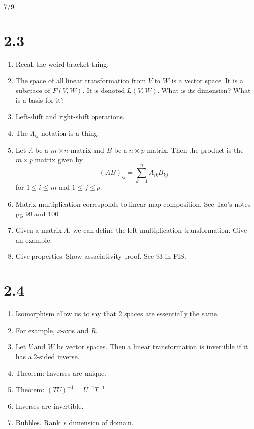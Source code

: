 \documentclass{article}
\begin{document}
\begin{center}
    7/9
\end{center}

\section{2.3}
\begin{enumerate}
    \item
        Recall the weird bracket thing.
    \item
        The space of all linear transformation from $V$ to $W$ is a vector
        space. It is a subspace of $F(V,W)$. It is denoted $L(V,W)$. What is
        its dimension? What is a basis for it?
    \item
        Left-shift and right-shift operations.
    \item
        The $A_{ij}$ notation is a thing.
    \item
        Let $A$ be a $m\times n$ matrix and $B$ be a $n\times p$ matrix. Then
        the product is the $m\times p$ matrix given by
        \[
            (AB)_{ij}=\sum_{k=1} ^n A_{ik} B_{kj}
        \]
        for $1\leq i\leq m$ and $1\leq j\leq p$.
    \item
        Matrix multiplication corresponds to linear map composition. See Tao's
        notes pg 99 and 100
    \item
        Given a matrix $A$, we can define the left multiplication
        transformation. Give an example.
    \item
        Give properties. Show associativity proof. See 93 in FIS.
\end{enumerate}

\section{2.4}
\begin{enumerate}
    \item 
        Isomorphism allow us to say that 2 spaces are essentially the same.
    \item
        For example, $x$-axis and $R$.
    \item
        Let $V$ and $W$ be vector spaces. Then a linear transformation is
        invertible if it has a 2-sided inverse.
    \item
        Theorem: Inverses are unique.
    \item
        Theorem: $(TU)^{-1}=U^{-1}T^{-1}$.
    \item
        Inverses are invertible.
    \item
        Bubbles. Rank is dimension of domain.
\end{enumerate}
\end{document}
